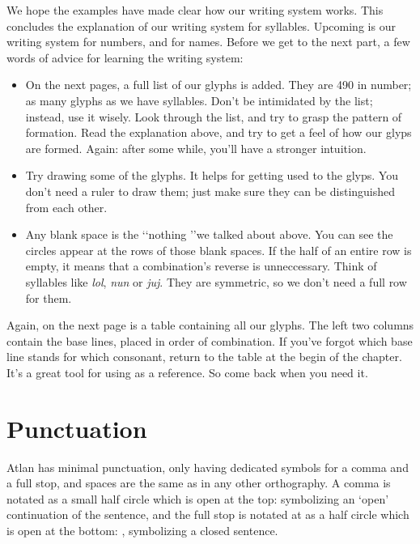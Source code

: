 We hope the examples have made clear how our writing system works. This concludes the explanation of our writing system for syllables. Upcoming is our writing system for numbers, and for names. Before we get to the next part, a few words of advice for learning the writing system:
\begin{itemize}
	\item On the next pages, a full list of our glyphs is added. They are 490 in number; as many glyphs as we have syllables. Don't be intimidated by the list; instead, use it wisely. Look through the list, and try to grasp the pattern of formation. Read the explanation above, and try to get a feel of how our glyps are formed. Again: after some while, you'll have a stronger intuition. 
	\item Try drawing some of the glyphs. It helps for getting used to the glyps. You don't need a ruler to draw them; just make sure they can be distinguished from each other. 
	\item Any blank space is the \lq\lq nothing \rq\rq we talked about above. You can see the circles appear at the rows of those blank spaces. If the half of an entire row is empty, it means that a combination's reverse is unneccessary. Think of syllables like {\it lol}, {\it nun} or {\it juj}. They are symmetric, so we don't need a full row for them. 
\end{itemize}

Again, on the next page is a table containing all our glyphs. The left two columns contain the base lines, placed in order of combination. If you've forgot which base line stands for which consonant, return to the table at the begin of the chapter. It's a great tool for using as a reference. So come back when you need it.  

%
\pagebreak
\pagebreak

\pagebreak


\restoregeometry
{}


\section{Punctuation}
Atlan has minimal punctuation, only having dedicated symbols for a comma and a full stop, and spaces are the same as in any other orthography. A comma is notated as a small half circle which is open at the top:  symbolizing an ‘open’ continuation of the sentence, and the full stop is notated at as a half circle which is open at the bottom: , symbolizing a closed sentence. 

